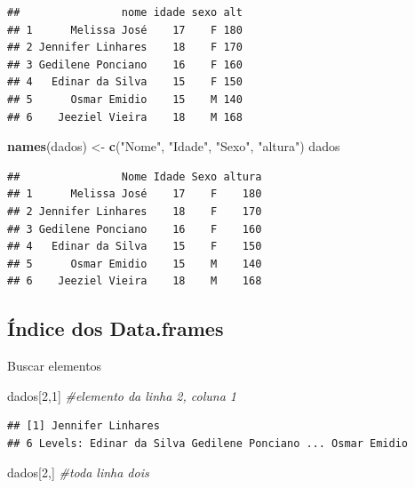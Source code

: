 \documentclass[]{book}
\newenvironment{Shaded}{\begin{snugshade}}{\end{snugshade}}
\newcommand{\CommentTok}[1]{\textcolor[rgb]{0.56,0.35,0.01}{\textit{#1}}}
\newcommand{\DecValTok}[1]{\textcolor[rgb]{0.00,0.00,0.81}{#1}}
\newcommand{\KeywordTok}[1]{\textcolor[rgb]{0.13,0.29,0.53}{\textbf{#1}}}
\newcommand{\NormalTok}[1]{#1}
\newcommand{\StringTok}[1]{\textcolor[rgb]{0.31,0.60,0.02}{#1}}
\begin{document}
\begin{verbatim}
##                nome idade sexo alt
## 1      Melissa José    17    F 180
## 2 Jennifer Linhares    18    F 170
## 3 Gedilene Ponciano    16    F 160
## 4   Edinar da Silva    15    F 150
## 5      Osmar Emidio    15    M 140
## 6    Jeeziel Vieira    18    M 168
\end{verbatim}

\begin{Shaded}
\begin{Highlighting}[]
\KeywordTok{names}\NormalTok{(dados) <-}\StringTok{ }\KeywordTok{c}\NormalTok{(}\StringTok{"Nome"}\NormalTok{, }\StringTok{"Idade"}\NormalTok{, }\StringTok{"Sexo"}\NormalTok{, }\StringTok{"altura"}\NormalTok{)}
\NormalTok{dados}
\end{Highlighting}
\end{Shaded}

\begin{verbatim}
##                Nome Idade Sexo altura
## 1      Melissa José    17    F    180
## 2 Jennifer Linhares    18    F    170
## 3 Gedilene Ponciano    16    F    160
## 4   Edinar da Silva    15    F    150
## 5      Osmar Emidio    15    M    140
## 6    Jeeziel Vieira    18    M    168
\end{verbatim}

\hypertarget{indice-dos-data.frames}{%
\subsection{Índice dos Data.frames}\label{indice-dos-data.frames}}

Buscar elementos

\begin{Shaded}
\begin{Highlighting}[]
\NormalTok{dados[}\DecValTok{2}\NormalTok{,}\DecValTok{1}\NormalTok{] }\CommentTok{#elemento da  linha  2, coluna 1}
\end{Highlighting}
\end{Shaded}

\begin{verbatim}
## [1] Jennifer Linhares
## 6 Levels: Edinar da Silva Gedilene Ponciano ... Osmar Emidio
\end{verbatim}

\begin{Shaded}
\begin{Highlighting}[]
\NormalTok{dados[}\DecValTok{2}\NormalTok{,] }\CommentTok{#toda linha dois}
\end{Highlighting}
\end{Shaded}
\end{document}
